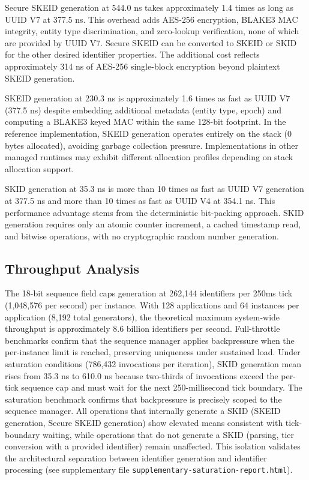 \documentclass[fleqn,10pt,lineno]{wlpeerj}
\newcounter{none} %
\begin{document}
Secure SKEID generation at 544.0 ns takes approximately 1.4 times as
long as UUID V7 at 377.5 ns. This overhead adds AES-256 encryption,
BLAKE3 MAC integrity, entity type discrimination, and zero-lookup
verification, none of which are provided by UUID V7. Secure SKEID can be
converted to SKEID or SKID for the other desired identifier properties.
The additional cost reflects approximately 314 ns of AES-256
single-block encryption beyond plaintext SKEID generation.

SKEID generation at 230.3 ns is approximately 1.6 times as fast as UUID
V7 (377.5 ns) despite embedding additional metadata (entity type, epoch)
and computing a BLAKE3 keyed MAC within the same 128-bit footprint. In
the reference implementation, SKEID generation operates entirely on the
stack (0 bytes allocated), avoiding garbage collection pressure.
Implementations in other managed runtimes may exhibit different
allocation profiles depending on stack allocation support.

SKID generation at 35.3 ns is more than 10 times as fast as UUID V7
generation at 377.5 ns and more than 10 times as fast as UUID V4 at
354.1 ns. This performance advantage stems from the deterministic
bit-packing approach. SKID generation requires only an atomic counter
increment, a cached timestamp read, and bitwise operations, with no
cryptographic random number generation.

\subsection{Throughput Analysis}\label{throughput-analysis}

The 18-bit sequence field caps generation at 262,144 identifiers per
250ms tick (1,048,576 per second) per instance. With 128 applications
and 64 instances per application (8,192 total generators), the
theoretical maximum system-wide throughput is approximately 8.6 billion
identifiers per second. Full-throttle benchmarks confirm that the
sequence manager applies backpressure when the per-instance limit is
reached, preserving uniqueness under sustained load. Under saturation
conditions (786,432 invocations per iteration), SKID generation mean
rises from 35.3 ns to 610.0 ns because two-thirds of invocations exceed
the per-tick sequence cap and must wait for the next 250-millisecond
tick boundary. The saturation benchmark confirms that backpressure is
precisely scoped to the sequence manager. All operations that internally
generate a SKID (SKEID generation, Secure SKEID generation) show
elevated means consistent with tick-boundary waiting, while operations
that do not generate a SKID (parsing, tier conversion with a provided
identifier) remain unaffected. This isolation validates the
architectural separation between identifier generation and identifier
processing (see supplementary file
\texttt{supplementary-saturation-report.html}).
\end{document}
